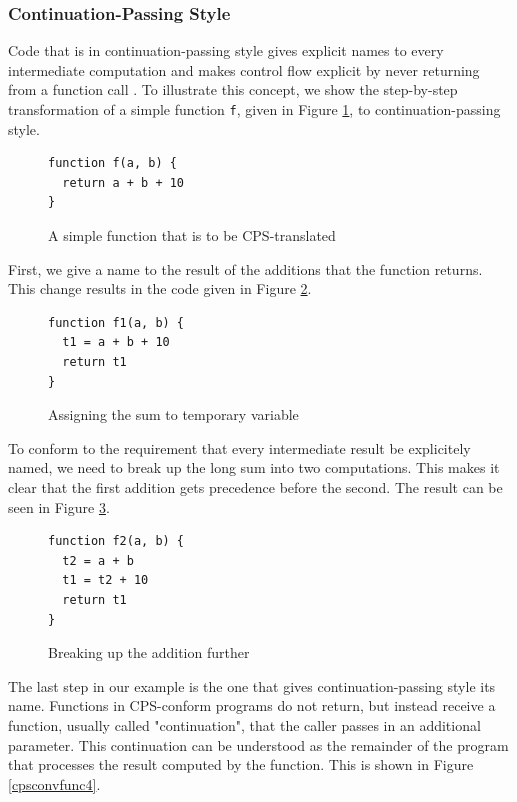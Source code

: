 \documentclass[11pt]{report}
\begin{document}
\subsubsection{Continuation-Passing Style}
Code that is in continuation-passing style gives explicit names to every intermediate computation and makes control flow explicit by never returning from a function call \cite{sysftal, appel}. To illustrate this concept, we show the step-by-step transformation of a simple function \texttt{f}, given in Figure \ref{cpsconvfunc1}, to continuation-passing style.

\begin{figure}[ht]
\begin{lstlisting}
function f(a, b) {
  return a + b + 10
}
\end{lstlisting}
\caption{A simple function that is to be CPS-translated}
\label{cpsconvfunc1}
\end{figure}

First, we give a name to the result of the additions that the function returns. This change results in the code given in Figure \ref{cpsconvfunc2}.

\begin{figure}[ht]
\begin{lstlisting}
function f1(a, b) {
  t1 = a + b + 10
  return t1
}
\end{lstlisting}
\caption{Assigning the sum to temporary variable}
\label{cpsconvfunc2}
\end{figure}

To conform to the requirement that every intermediate result be explicitely named, we need to break up the long sum into two computations. This makes it clear that the first addition gets precedence before the second. The result can be seen in Figure \ref{cpsconvfunc3}.

\begin{figure}[ht]
\begin{lstlisting}
function f2(a, b) {
  t2 = a + b
  t1 = t2 + 10
  return t1
}
\end{lstlisting}
\caption{Breaking up the addition further}
\label{cpsconvfunc3}
\end{figure}

The last step in our example is the one that gives continuation-passing style its name. Functions in CPS-conform programs do not return, but instead receive a function, usually called "continuation", that the caller passes in an additional parameter. This continuation can be understood as the remainder of the program that processes the result computed by the function. This is shown in Figure \ref{cpsconvfunc4}.
\end{document}
